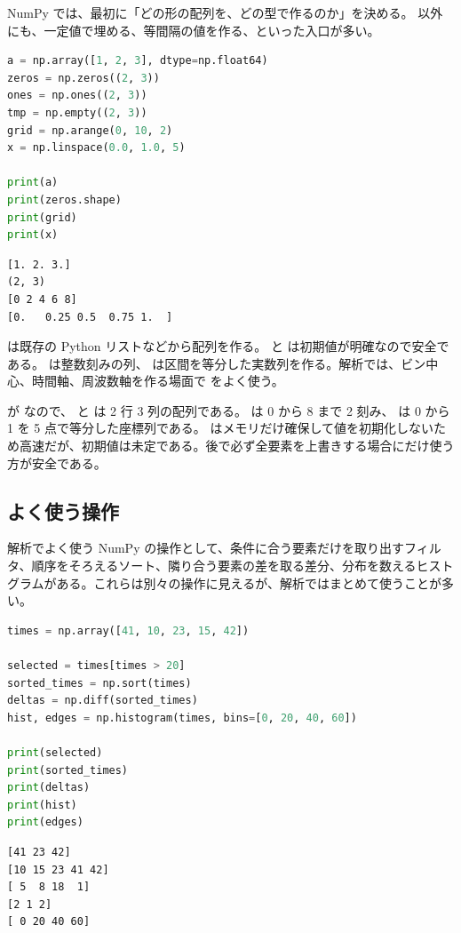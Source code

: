 NumPy では、最初に「どの形の配列を、どの型で作るのか」を決める。 以外にも、一定値で埋める、等間隔の値を作る、といった入口が多い。

\begin{lstlisting}[language=Python]
a = np.array([1, 2, 3], dtype=np.float64)
zeros = np.zeros((2, 3))
ones = np.ones((2, 3))
tmp = np.empty((2, 3))
grid = np.arange(0, 10, 2)
x = np.linspace(0.0, 1.0, 5)

print(a)
print(zeros.shape)
print(grid)
print(x)
\end{lstlisting}

\begin{lstlisting}[numbers=none, xleftmargin=2\zw]
[1. 2. 3.]
(2, 3)
[0 2 4 6 8]
[0.   0.25 0.5  0.75 1.  ]
\end{lstlisting}

 は既存の Python リストなどから配列を作る。 と  は初期値が明確なので安全である。 は整数刻みの列、 は区間を等分した実数列を作る。解析では、ビン中心、時間軸、周波数軸を作る場面で  をよく使う。

 が  なので、 と  は 2 行 3 列の配列である。 は 0 から 8 まで 2 刻み、 は 0 から 1 を 5 点で等分した座標列である。 はメモリだけ確保して値を初期化しないため高速だが、初期値は未定である。後で必ず全要素を上書きする場合にだけ使う方が安全である。

\subsection{よく使う操作}

解析でよく使う NumPy の操作として、条件に合う要素だけを取り出すフィルタ、順序をそろえるソート、隣り合う要素の差を取る差分、分布を数えるヒストグラムがある。これらは別々の操作に見えるが、解析ではまとめて使うことが多い。

\begin{lstlisting}[language=Python]
times = np.array([41, 10, 23, 15, 42])

selected = times[times > 20]
sorted_times = np.sort(times)
deltas = np.diff(sorted_times)
hist, edges = np.histogram(times, bins=[0, 20, 40, 60])

print(selected)
print(sorted_times)
print(deltas)
print(hist)
print(edges)
\end{lstlisting}

\begin{lstlisting}[numbers=none]
[41 23 42]
[10 15 23 41 42]
[ 5  8 18  1]
[2 1 2]
[ 0 20 40 60]
\end{lstlisting}

